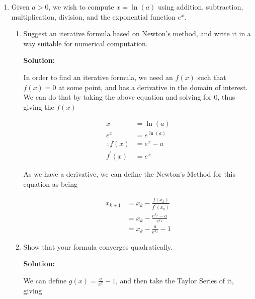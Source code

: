 \documentclass[12pt]{article}
\begin{document}
\begin{enumerate}
\begin{enumerate}
{\bf Solution:}

To use the Bisection Method, we need two points $x_{0}$ and $x_{1}$ in the domain.
It is also required that $f\left(x_{0}\right)$ has a different sign than $f\left(x_{1}\right)$,
which since $f(x)$ is positive over the entire domain, cannot hold true. Therefore, the Bisection Method
cannot be used.

\end{enumerate}

\item Given $a > 0$, we wish to compute $x = \ln (a)$ using addition, subtraction, multiplication,
division, and the exponential function $e^{x}$.
\begin{enumerate}
\item Suggest an iterative formula based on Newton's method, and write it in a way suitable
for numerical computation.

{\bf Solution:}

In order to find an iterative formula, we need an $f(x)$ such that $f(x) = 0$ at some point,
and has a derivative in the domain of interest. We can do that by taking the above equation and solving for 0, thus giving the $f(x)$

\begin{align*}
x &= \ln(a)\\
e^{x} &= e^{\ln (a)}\\
\therefore f(x) &= e^{x} - a\\
f^{\prime}(x) &= e^{x}
\end{align*}

As we have a derivative, we can define the Newton's Method for this equation as being

\begin{align*}
x_{k+1} &= x_{k} - \frac{f(x_{k})}{f^{\prime}(x_{k})}\\
        &= x_{k} - \frac{e^{x_{k}} - a}{e^{x_{k}}}\\
        &= x_{k} - \frac{a}{e^{x_{k}}} - 1
\end{align*}

\item Show that your formula converges quadratically.

{\bf Solution:}

We can define $g(x) = \frac{a}{e^{x}} - 1$, and then take the Taylor Series of it, giving


\end{enumerate}
\end{enumerate}
\end{document}

